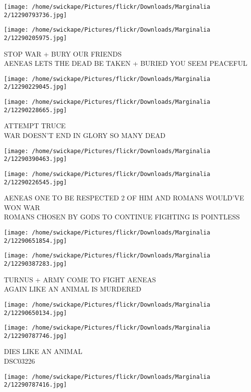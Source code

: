 \documentclass[10pt,letterpaper]{article}
\begin{document}
\texttt{[image: /home/swickape/Pictures/flickr/Downloads/Marginalia 2/12290793736.jpg]}

\vspace{0.25in}
\texttt{[image: /home/swickape/Pictures/flickr/Downloads/Marginalia 2/12290205975.jpg]}

STOP WAR + BURY OUR FRIENDS\\
AENEAS LETS THE DEAD BE TAKEN + BURIED YOU SEEM PEACEFUL
\pagebreak

\texttt{[image: /home/swickape/Pictures/flickr/Downloads/Marginalia 2/12290229045.jpg]}

\vspace{0.25in}
\texttt{[image: /home/swickape/Pictures/flickr/Downloads/Marginalia 2/12290228665.jpg]}

ATTEMPT TRUCE\\
WAR DOESN'T END IN GLORY SO MANY DEAD
\pagebreak

\texttt{[image: /home/swickape/Pictures/flickr/Downloads/Marginalia 2/12290390463.jpg]}

\vspace{0.25in}
\texttt{[image: /home/swickape/Pictures/flickr/Downloads/Marginalia 2/12290226545.jpg]}

AENEAS ONE TO BE RESPECTED 2 OF HIM AND ROMANS WOULD'VE WON WAR\\
ROMANS CHOSEN BY GODS TO CONTINUE FIGHTING IS POINTLESS
\pagebreak

\texttt{[image: /home/swickape/Pictures/flickr/Downloads/Marginalia 2/12290651854.jpg]}

\vspace{0.25in}
\texttt{[image: /home/swickape/Pictures/flickr/Downloads/Marginalia 2/12290387283.jpg]}

TURNUS + ARMY COME TO FIGHT AENEAS\\
AGAIN LIKE AN ANIMAL IS MURDERED
\pagebreak

\texttt{[image: /home/swickape/Pictures/flickr/Downloads/Marginalia 2/12290650134.jpg]}

\vspace{0.25in}
\texttt{[image: /home/swickape/Pictures/flickr/Downloads/Marginalia 2/12290787746.jpg]}

DIES LIKE AN ANIMAL\\
DSC03226
\pagebreak

\texttt{[image: /home/swickape/Pictures/flickr/Downloads/Marginalia 2/12290787416.jpg]}
\end{document}
